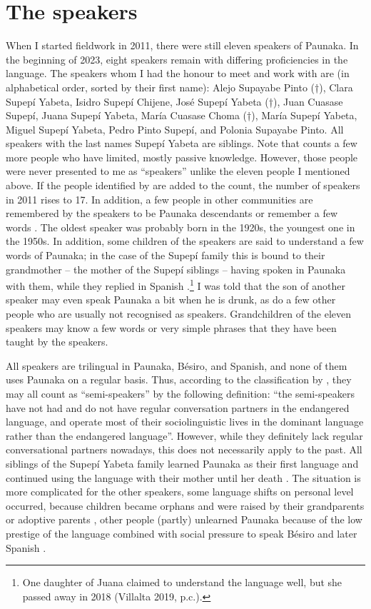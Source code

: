 \section{The speakers}\label{sec:Speakers}

When I started fieldwork in 2011, there were still eleven speakers of Paunaka. In the beginning of 2023, eight speakers remain with differing proficiencies in the language. The speakers whom I had the honour to meet and work with are (in alphabetical order, sorted by their first name): Alejo Supayabe Pinto (†), Clara Supepí Yabeta, Isidro Supepí Chijene, José Supepí Yabeta (†), Juan Cuasase Supepí, Juana Supepí Yabeta, María Cuasase Choma (†), María Supepí Yabeta, Miguel Supepí Yabeta, Pedro Pinto Supepí, and Polonia Supayabe Pinto. All speakers with the last names Supepí Yabeta are siblings. Note that \citet[167]{Villalta2022} counts a few more people who have limited, mostly passive knowledge. However, those people were never presented to me as “speakers” unlike the eleven people I mentioned above. If the people identified by \citet[]{Villalta2022} are added to the count, the number of speakers in 2011 rises to 17. In addition, a few people in other communities are remembered by the speakers to be Paunaka descendants or remember a few words \citep[195--197]{Villalta2022}. The oldest speaker was probably born in the 1920s, the youngest one in the 1950s. In addition, some children of the speakers are said to understand a few words of Paunaka; in the case of the Supepí family this is bound to their grandmother – the mother of the Supepí siblings – having spoken in Paunaka with them, while they replied in Spanish \citep[171]{Villalta2022}.\footnote{One daughter of Juana claimed to understand the language well, but she passed away in 2018 (Villalta 2019, p.c.).} I was told that the son of another speaker may even speak Paunaka a bit when he is drunk, as do a few other people who are usually not recognised as speakers. Grandchildren of the eleven speakers may know a few words or very simple phrases that they have been taught by the speakers.

All speakers are trilingual in Paunaka, Bésiro, and Spanish, and none of them uses Paunaka on a regular basis. Thus, according to the classification by \citet[50]{GrinevaldBert2011}, they may all count as “semi-speakers” by the following definition: “the semi-speakers have not had and do not have regular conversation partners in the endangered language, and operate most of their sociolinguistic lives in the dominant language rather than the endangered language”. However, while they definitely lack regular conversational partners nowadays, this does not necessarily apply to the past. All siblings of the Supepí Yabeta family learned Paunaka as their first language and continued using the language with their mother until her death \citep[cf.][5, 145]{Villalta2022}. The situation is more complicated for the other speakers, some language shifts on personal level occurred, because children became orphans and were raised by their grandparents or adoptive parents \citep[133, 135, 138]{Villalta2022}, other people (partly) unlearned Paunaka because of the low prestige of the language combined with social pressure to speak Bésiro and later Spanish \citep[cf.][115]{Villalta2022}. 

